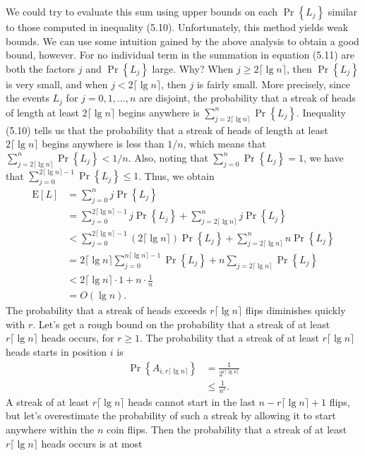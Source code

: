\documentclass[lang=cn,newtx,10pt,scheme=chinese]{elegantbook}
\begin{document}
We could try to evaluate this sum using upper bounds on each $\operatorname{Pr}\left\{L_j\right\}$ similar to those computed in inequality (5.10). Unfortunately, this method yields weak bounds. We can use some intuition gained by the above analysis to obtain a good bound, however. For no individual term in the summation in equation (5.11) are both the factors $j$ and $\operatorname{Pr}\left\{L_j\right\}$ large. Why? When $j \geq 2\lceil\lg n\rceil$, then $\operatorname{Pr}\left\{L_j\right\}$ is very small, and when $j<2\lceil\lg n\rceil$, then $j$ is fairly small. More precisely, since the events $L_j$ for $j=0,1, \ldots, n$ are disjoint, the probability that a streak of heads of length at least $2\lceil\lg n\rceil$ begins anywhere is $\sum_{j=2\lceil\lg n\rceil}^n \operatorname{Pr}\left\{L_j\right\}$. Inequality (5.10) tells us that the probability that a streak of heads of length at least $2\lceil\lg n\rceil$ begins anywhere is less than $1 / n$, which means that $\sum_{j=2\lceil\lg n\rceil}^n \operatorname{Pr}\left\{L_j\right\}<1 / n$. Also, noting that $\sum_{j=0}^n \operatorname{Pr}\left\{L_j\right\}=1$, we have that $\sum_{j=0}^{2\lceil\lg n\rceil-1} \operatorname{Pr}\left\{L_j\right\} \leq 1$. Thus, we obtain
$$
\begin{aligned}
\mathrm{E}[L] & =\sum_{j=0}^n j \operatorname{Pr}\left\{L_j\right\} \\
& =\sum_{j=0}^{2\lceil\lg n\rceil-1} j \operatorname{Pr}\left\{L_j\right\}+\sum_{j=2\lceil\lg n\rceil}^n j \operatorname{Pr}\left\{L_j\right\} \\
& <\sum_{j=0}^{2\lceil\lg n\rceil-1}(2\lceil\lg n\rceil) \operatorname{Pr}\left\{L_j\right\}+\sum_{j=2\lceil\lg n\rceil}^n n \operatorname{Pr}\left\{L_j\right\} \\
& =2\lceil\lg n\rceil \sum_{j=0}^{n\lceil\lg n\rceil-1} \operatorname{Pr}\left\{L_j\right\}+n \sum_{j=2\lceil\lg n\rceil} \operatorname{Pr}\left\{L_j\right\} \\
& <2\lceil\lg n\rceil \cdot 1+n \cdot \frac{1}{n} \\
& =O(\lg n) .
\end{aligned}
$$
The probability that a streak of heads exceeds $r\lceil\lg n\rceil$ flips diminishes quickly with $r$. Let's get a rough bound on the probability that a streak of at least $r\lceil\lg n\rceil$ heads occurs, for $r \geq 1$. The probability that a streak of at least $r\lceil\lg n\rceil$ heads starts in position $i$ is
$$
\begin{aligned}
\operatorname{Pr}\left\{A_{i, r\lceil\lg n\rceil}\right\} & =\frac{1}{2^{r\lceil\lg n\rceil}} \\
& \leq \frac{1}{n^r} .
\end{aligned}
$$
A streak of at least $r\lceil\lg n\rceil$ heads cannot start in the last $n-r\lceil\lg n\rceil+1$ flips, but let's overestimate the probability of such a streak by allowing it to start anywhere within the $n$ coin flips. Then the probability that a streak of at least $r\lceil\lg n\rceil$ heads occurs is at most
\end{document}
